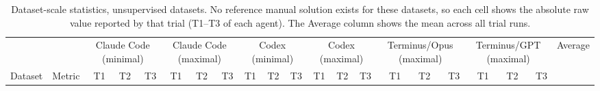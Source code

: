 \begin{table}[t]
\centering
\setlength{\tabcolsep}{4pt}
\begin{tabular}{l l rrr rrr rrr rrr rrr rrr c}
\toprule
 & & \multicolumn{3}{c}{Claude Code (minimal)} & \multicolumn{3}{c}{Claude Code (maximal)} & \multicolumn{3}{c}{Codex (minimal)} & \multicolumn{3}{c}{Codex (maximal)} & \multicolumn{3}{c}{Terminus/Opus (maximal)} & \multicolumn{3}{c}{Terminus/GPT (maximal)} & Average \\
\cmidrule(lr){3-5} \cmidrule(lr){6-8} \cmidrule(lr){9-11} \cmidrule(lr){12-14} \cmidrule(lr){15-17} \cmidrule(lr){18-20}
Dataset & Metric & T1 & T2 & T3 & T1 & T2 & T3 & T1 & T2 & T3 & T1 & T2 & T3 & T1 & T2 & T3 & T1 & T2 & T3 & \\
\midrule
\bottomrule
\end{tabular}
\caption{Dataset-scale statistics, unsupervised datasets. No reference manual solution exists for these datasets, so each cell shows the absolute raw value reported by that trial (T1--T3 of each agent). The Average column shows the mean across all trial runs.}
\label{tab:scale-unsupervised}
\end{table}
